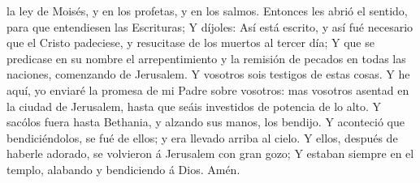 la ley de Moisés, y en los profetas, y en los salmos. 
Entonces les abrió el sentido, para que entendiesen las Escrituras;
 Y díjoles: Así está escrito, y así fué necesario que el
Cristo padeciese, y resucitase de los muertos al tercer día;
 Y que se predicase en su nombre el arrepentimiento y la
remisión de pecados en todas las naciones, comenzando de Jerusalem.
 Y vosotros sois testigos de estas cosas. 
Y he aquí, yo enviaré la promesa de mi Padre sobre vosotros: mas
vosotros asentad en la ciudad de Jerusalem, hasta que seáis investidos
de potencia de lo alto.  Y sacólos fuera hasta Bethania,
y alzando sus manos, los bendijo.  Y aconteció que
bendiciéndolos, se fué de ellos; y era llevado arriba al cielo.
 Y ellos, después de haberle adorado, se volvieron á
Jerusalem con gran gozo;  Y estaban siempre en el templo,
alabando y bendiciendo á Dios. Amén.
